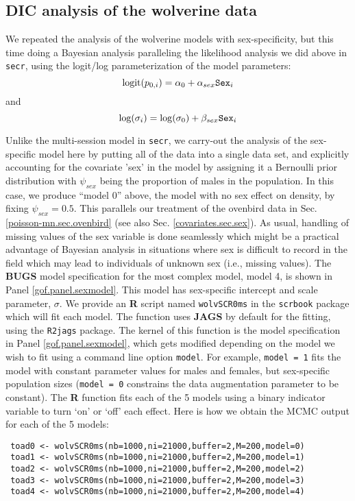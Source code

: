 \subsection{DIC analysis of the wolverine data}

We repeated the analysis of the wolverine models with sex-specificity,
but this time doing a Bayesian analysis paralleling the likelihood
analysis we did above in \mbox{\tt secr}, using the logit/log
parameterization of the model parameters:
\[
 \mbox{logit}(p_{0,i}) = \alpha_{0} + \alpha_{sex} \mbox{\tt Sex}_{i}
\]
and
\[
 \mbox{log}(\sigma_{i}) = \log(\sigma_{0}) + \beta_{sex} \mbox{\tt Sex}_{i}
\]

Unlike the multi-session model in \mbox{\tt secr}, we carry-out the
analysis of the sex-specific model here by putting all of the data
into a single data set, and explicitly accounting for the covariate
'sex' in the model by assigning it a Bernoulli prior distribution with
$\psi_{sex}$ being the proportion of males in the population. In this
case, we produce ``model 0'' above, the model with no sex effect on
density, by fixing $\psi_{sex} = 0.5$. This parallels our treatment of
the ovenbird data in Sec. \ref{poisson-mn.sec.ovenbird} (see also
Sec. \ref{covariates.sec.sex}).  As usual, handling of missing values
of the sex variable is done seamlessly which might be a practical
advantage of Bayesian analysis in situations where sex is difficult to
record in the field which may lead to individuals of unknown sex
(i.e., missing values).  The {\bf BUGS} model specification for the
most complex model, model 4, is shown in Panel
\ref{gof.panel.sexmodel}.  This model has sex-specific intercept and
scale parameter, $\sigma$.  We provide an {\bf R} script named
\mbox{\tt wolvSCR0ms} in the \mbox{\tt scrbook} package which will fit
each model.  The function uses {\bf JAGS} by default for the fitting,
using the \mbox{\tt R2jags} package.  The kernel of this function is
the model specification in Panel \ref{gof.panel.sexmodel}, which gets
modified depending on the model we wish to fit using a command line
option \mbox{\tt model}. For example, \mbox{\tt model = 1} fits the
model with constant parameter values for males and females, but
sex-specific population sizes (\mbox{\tt model = 0} constrains the
data augmentation parameter to be constant).  The {\bf R} function
fits each of the 5 models using a binary indicator variable to turn
`on' or `off' each effect.  Here is how we obtain the MCMC output for
each of the 5 models: {\small
\begin{verbatim}
 toad0 <- wolvSCR0ms(nb=1000,ni=21000,buffer=2,M=200,model=0)
 toad1 <- wolvSCR0ms(nb=1000,ni=21000,buffer=2,M=200,model=1)
 toad2 <- wolvSCR0ms(nb=1000,ni=21000,buffer=2,M=200,model=2)
 toad3 <- wolvSCR0ms(nb=1000,ni=21000,buffer=2,M=200,model=3)
 toad4 <- wolvSCR0ms(nb=1000,ni=21000,buffer=2,M=200,model=4)
\end{verbatim}
}



